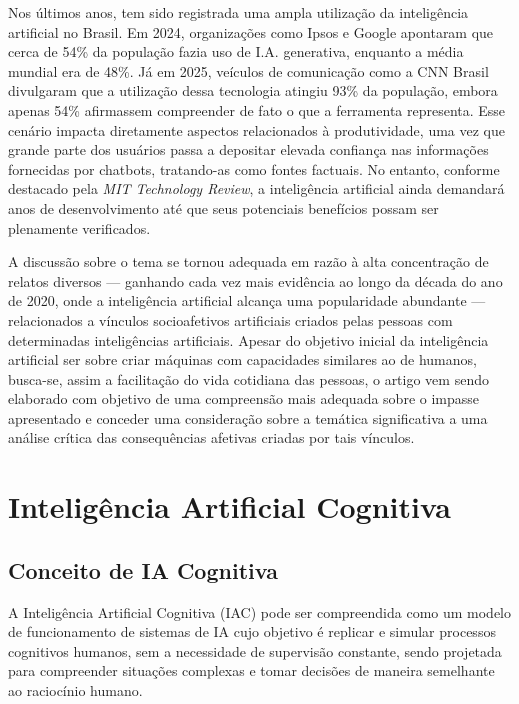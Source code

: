 \documentclass[12pt]{article}
\begin{document}
Nos últimos anos, tem sido registrada uma ampla utilização da inteligência artificial no Brasil. Em 2024, organizações como Ipsos e Google apontaram que cerca de 54\% da população fazia uso de I.A. generativa, enquanto a média mundial era de 48\%. Já em 2025, veículos de comunicação como a CNN Brasil divulgaram que a utilização dessa tecnologia atingiu 93\% da população, embora apenas 54\% afirmassem compreender de fato o que a ferramenta representa. Esse cenário impacta diretamente aspectos relacionados à produtividade, uma vez que grande parte dos usuários passa a depositar elevada confiança nas informações fornecidas por chatbots, tratando-as como fontes factuais. No entanto, conforme destacado pela \textit{MIT Technology Review}, a inteligência artificial ainda demandará anos de desenvolvimento até que seus potenciais benefícios possam ser plenamente verificados. \cite{agenciabrasil2025ia} \cite{cnnbrasil}

A discussão sobre o tema se tornou adequada em razão à alta concentração de relatos diversos — ganhando cada vez mais evidência ao longo da década do ano de 2020, onde a inteligência artificial alcança uma popularidade abundante — relacionados a vínculos socioafetivos artificiais criados pelas pessoas com determinadas inteligências artificiais. Apesar do objetivo inicial da inteligência artificial ser sobre criar máquinas com capacidades similares ao de humanos, busca-se, assim a facilitação do vida cotidiana das pessoas, o artigo vem sendo elaborado com objetivo de uma compreensão mais adequada sobre o impasse apresentado e conceder uma consideração sobre a temática significativa a uma análise crítica das consequências afetivas criadas por tais vínculos.

\section{Inteligência Artificial Cognitiva}

\subsection{Conceito de IA Cognitiva} 

A Inteligência Artificial Cognitiva (IAC) pode ser compreendida como um modelo de funcionamento de sistemas de IA cujo objetivo é replicar e simular processos cognitivos humanos, sem a necessidade de supervisão constante, sendo projetada para compreender situações complexas e tomar decisões de maneira semelhante ao raciocínio humano. \cite{stefanini2024}
\end{document}
